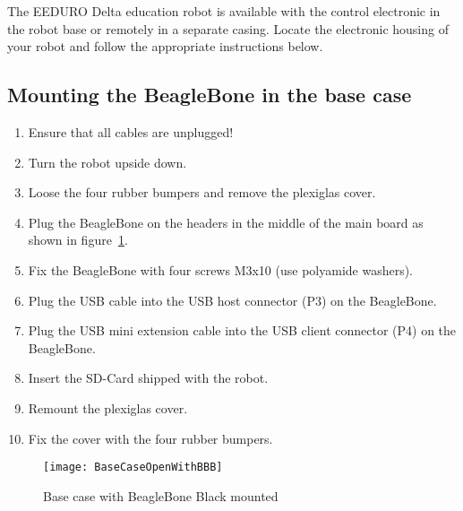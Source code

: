The EEDURO Delta education robot is available with the control electronic in the robot base or remotely in a separate casing. Locate the electronic housing of your robot and follow the appropriate instructions below.

\subsection{Mounting the BeagleBone in the base case}
\begin{enumerate}
	\item Ensure that all cables are unplugged!
	\item Turn the robot upside down.
	\item Loose the four rubber bumpers and remove the plexiglas cover.
	\item Plug the BeagleBone on the headers in the middle of the main board as shown in figure~\ref{fig:BaseCaseOpenWithBBB}.
	\item Fix the BeagleBone with four screws M3x10 (use polyamide washers).
	\item Plug the USB cable into the USB host connector (P3) on the BeagleBone.
	\item Plug the USB mini extension cable into the USB client connector (P4) on the BeagleBone.
	\item Insert the SD-Card shipped with the robot.
	\item Remount the plexiglas cover.
	\item Fix the cover with the four rubber bumpers.
\end{enumerate}

\begin{figure}[htbp]
	\centering
	\texttt{[image: BaseCaseOpenWithBBB]}
	\caption{Base case with BeagleBone Black mounted}
	\label{fig:BaseCaseOpenWithBBB}
\end{figure}

